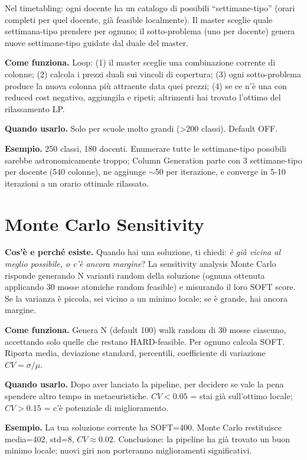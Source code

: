 Nel timetabling: ogni docente ha un catalogo di possibili
``settimane-tipo'' (orari completi per quel docente, gi\`a
feasible localmente). Il master sceglie quale settimana-tipo
prendere per ognuno; il sotto-problema (uno per docente) genera
nuove settimane-tipo guidate dal duale del master.

\textbf{Come funziona.} Loop: (1) il master sceglie una
combinazione corrente di colonne; (2) calcola i prezzi duali
sui vincoli di copertura; (3) ogni sotto-problema produce la
nuova colonna pi\`u attraente data quei prezzi; (4) se ce
n'\`e una con reduced cost negativo, aggiungila e ripeti;
altrimenti hai trovato l'ottimo del rilassamento LP.

\textbf{Quando usarlo.} Solo per scuole molto grandi
(>200 classi). Default OFF.

\textbf{Esempio.} 250 classi, 180 docenti. Enumerare tutte
le settimane-tipo possibili sarebbe astronomicamente troppo;
Column Generation parte con 3 settimane-tipo per docente
(540 colonne), ne aggiunge $\sim$50 per iterazione, e
converge in 5-10 iterazioni a un orario ottimale rilassato.

\section{Monte Carlo Sensitivity}

\textbf{Cos'\`e e perch\'e esiste.} Quando hai una soluzione,
ti chiedi: \emph{\`e gi\`a vicina al meglio possibile, o c'\`e
ancora margine}? La sensitivity analysis Monte Carlo risponde
generando N varianti random della soluzione (ognuna ottenuta
applicando 30 mosse atomiche random feasible) e misurando il
loro SOFT score. Se la varianza \`e piccola, sei vicino a un
minimo locale; se \`e grande, hai ancora margine.

\textbf{Come funziona.} Genera N (default 100) walk random
di 30 mosse ciascuno, accettando solo quelle che restano
HARD-feasible. Per ognuno calcola SOFT. Riporta media,
deviazione standard, percentili, coefficiente di variazione
$CV = \sigma/\mu$.

\textbf{Quando usarlo.} Dopo aver lanciato la pipeline, per
decidere se vale la pena spendere altro tempo in metaeuristiche.
$CV < 0.05$ = stai gi\`a sull'ottimo locale; $CV > 0.15$ =
c'\`e potenziale di miglioramento.

\textbf{Esempio.} La tua soluzione corrente ha SOFT=400. Monte
Carlo restituisce media=402, std=8, $CV \approx 0.02$. Conclusione:
la pipeline ha gi\`a trovato un buon minimo locale; nuovi
giri non porteranno miglioramenti significativi.

